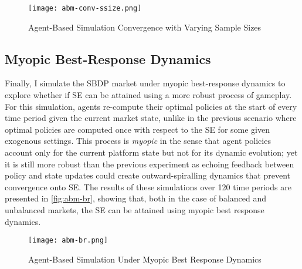 \begin{figure}[ht] 
    \centering
    \caption{Agent-Based Simulation Convergence with Varying Sample Sizes}
    \texttt{[image: abm-conv-ssize.png]}
    \label{fig:abm-conv-ssize}
\end{figure} 

\subsection{Myopic Best-Response Dynamics}
Finally, I simulate the SBDP market under myopic best-response dynamics \citep{fudenberg1998theory} to explore whether if SE can be attained using a more robust process of gameplay. 
For this simulation, agents re-compute their optimal policies at the start of every time period given the current market state, unlike in the previous scenario where optimal policies are computed once with respect to the SE for some given exogenous settings. 
This process is \textit{myopic} in the sense that agent policies account only for the current platform state but not for its dynamic evolution; yet it is still more robust than the previous experiment as echoing feedback between policy and state updates could create outward-spiralling dynamics that prevent convergence onto SE. 
The results of these simulations over 120 time periods are presented in \autoref{fig:abm-br}, showing that, both in the case of balanced and unbalanced markets, the SE can be attained using myopic best response dynamics.

\begin{figure}[ht] 
    \centering
    \caption{Agent-Based Simulation Under Myopic Best Response Dynamics}
    \texttt{[image: abm-br.png]}
    \label{fig:abm-br}
\end{figure}   
